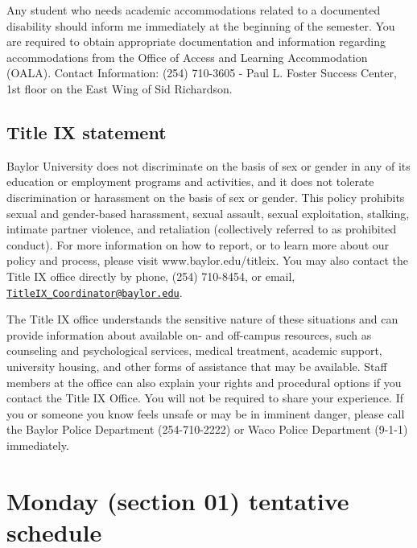 \documentclass[11pt,]{article}
\begin{document}
Any student who needs academic accommodations related to a documented
disability should inform me immediately at the beginning of the
semester. You are required to obtain appropriate documentation and
information regarding accommodations from the Office of Access and
Learning Accommodation (OALA). Contact Information: (254) 710-3605 -
Paul L. Foster Success Center, 1st floor on the East Wing of Sid
Richardson.

\hypertarget{title-ix-statement}{%
\subsection{Title IX statement}\label{title-ix-statement}}

Baylor University does not discriminate on the basis of sex or gender in
any of its education or employment programs and activities, and it does
not tolerate discrimination or harassment on the basis of sex or gender.
This policy prohibits sexual and gender-based harassment, sexual
assault, sexual exploitation, stalking, intimate partner violence, and
retaliation (collectively referred to as prohibited conduct). For more
information on how to report, or to learn more about our policy and
process, please visit www.baylor.edu/titleix. You may also contact the
Title IX office directly by phone, (254) 710-8454, or email,
\href{mailto:TitleIX_Coordinator@baylor.edu}{\nolinkurl{TitleIX\_Coordinator@baylor.edu}}.

The Title IX office understands the sensitive nature of these situations
and can provide information about available on- and off-campus
resources, such as counseling and psychological services, medical
treatment, academic support, university housing, and other forms of
assistance that may be available. Staff members at the office can also
explain your rights and procedural options if you contact the Title IX
Office. You will not be required to share your experience. If you or
someone you know feels unsafe or may be in imminent danger, please call
the Baylor Police Department (254-710-2222) or Waco Police Department
(9-1-1) immediately.

\newpage

\hypertarget{monday-section-01-tentative-schedule}{%
\section{Monday (section 01) tentative
schedule}\label{monday-section-01-tentative-schedule}}
\end{document}
